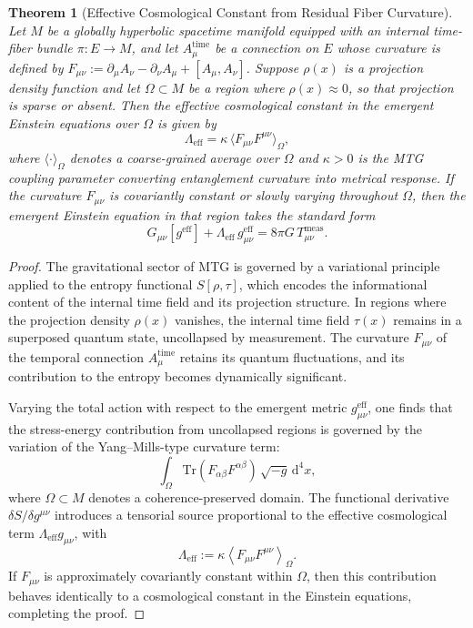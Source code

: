 \documentclass[11pt]{article}
\newtheorem{theorem}{Theorem}
\begin{document}
\begin{theorem}[Effective Cosmological Constant from Residual Fiber Curvature]
Let $M$ be a globally hyperbolic spacetime manifold equipped with an internal time-fiber bundle $\pi: E \to M$, and let $A^{\mathrm{time}}_\mu$ be a connection on $E$ whose curvature is defined by $F_{\mu\nu} := \partial_\mu A_\nu - \partial_\nu A_\mu + [A_\mu, A_\nu]$. Suppose $\rho(x)$ is a projection density function and let $\Omega \subset M$ be a region where $\rho(x) \approx 0$, so that projection is sparse or absent. Then the effective cosmological constant in the emergent Einstein equations over $\Omega$ is given by
\begin{equation}
\Lambda_{\mathrm{eff}} = \kappa \, \langle F_{\mu\nu} F^{\mu\nu} \rangle_{\Omega},
\end{equation}
where $\langle \cdot \rangle_{\Omega}$ denotes a coarse-grained average over $\Omega$ and $\kappa > 0$ is the MTG coupling parameter converting entanglement curvature into metrical response. If the curvature $F_{\mu\nu}$ is covariantly constant or slowly varying throughout $\Omega$, then the emergent Einstein equation in that region takes the standard form
\begin{equation}
G_{\mu\nu}[g^{\mathrm{eff}}] + \Lambda_{\mathrm{eff}} \, g^{\mathrm{eff}}_{\mu\nu} = 8\pi G \, T^{\mathrm{meas}}_{\mu\nu}.
\end{equation}
\end{theorem}

\begin{proof}
The gravitational sector of MTG is governed by a variational principle applied to the entropy functional \( S[\rho, \tau] \), which encodes the informational content of the internal time field and its projection structure. In regions where the projection density \( \rho(x) \) vanishes, the internal time field \( \tau(x) \) remains in a superposed quantum state, uncollapsed by measurement. The curvature \( F_{\mu\nu} \) of the temporal connection \( A^{\mathrm{time}}_\mu \) retains its quantum fluctuations, and its contribution to the entropy becomes dynamically significant.

Varying the total action with respect to the emergent metric \( g^{\mathrm{eff}}_{\mu\nu} \), one finds that the stress-energy contribution from uncollapsed regions is governed by the variation of the Yang–Mills-type curvature term:
\begin{equation}
\int_{\Omega} \mathrm{Tr}(F_{\alpha\beta} F^{\alpha\beta}) \, \sqrt{-g} \, \mathrm{d}^4x,
\end{equation}
where \( \Omega \subset M \) denotes a coherence-preserved domain. The functional derivative \( \delta S / \delta g^{\mu\nu} \) introduces a tensorial source proportional to the effective cosmological term \( \Lambda_{\mathrm{eff}} g_{\mu\nu} \), with
\begin{equation}
\Lambda_{\mathrm{eff}} := \kappa \left\langle F_{\mu\nu} F^{\mu\nu} \right\rangle_{\Omega}.
\end{equation}
If \( F_{\mu\nu} \) is approximately covariantly constant within \( \Omega \), then this contribution behaves identically to a cosmological constant in the Einstein equations, completing the proof.
\end{proof}
\end{document}
